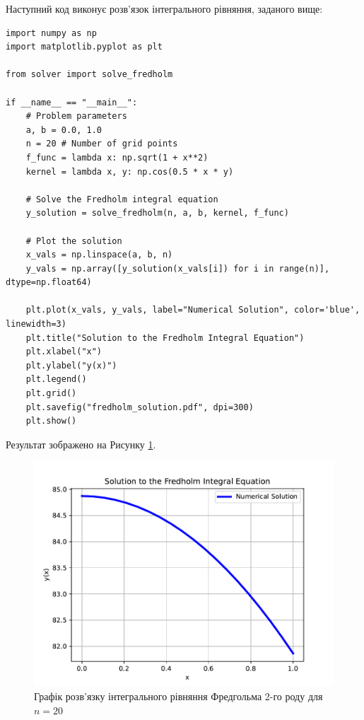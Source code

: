 \documentclass[14pt]{extarticle}
\begin{document}
Наступний код виконує розв'язок інтегрального рівняння, заданого вище:
\begin{verbatim}
import numpy as np
import matplotlib.pyplot as plt

from solver import solve_fredholm

if __name__ == "__main__":
    # Problem parameters
    a, b = 0.0, 1.0
    n = 20 # Number of grid points
    f_func = lambda x: np.sqrt(1 + x**2)
    kernel = lambda x, y: np.cos(0.5 * x * y)
    
    # Solve the Fredholm integral equation
    y_solution = solve_fredholm(n, a, b, kernel, f_func)
    
    # Plot the solution
    x_vals = np.linspace(a, b, n)
    y_vals = np.array([y_solution(x_vals[i]) for i in range(n)], dtype=np.float64)
    
    plt.plot(x_vals, y_vals, label="Numerical Solution", color='blue', linewidth=3)
    plt.title("Solution to the Fredholm Integral Equation")
    plt.xlabel("x")
    plt.ylabel("y(x)")
    plt.legend()
    plt.grid()
    plt.savefig("fredholm_solution.pdf", dpi=300)
    plt.show()
\end{verbatim}

Результат зображено на Рисунку \ref{fig:fredholm_solution}.

\begin{figure}[H]
    \centering
    \includegraphics[width=\textwidth]{appendices/homework_4/fredholm_solution.pdf}
    \caption{Графік розв'язку інтегрального рівняння Фредгольма 2-го роду для 
    $n=20$}
    \label{fig:fredholm_solution}
\end{figure}
\end{document}
